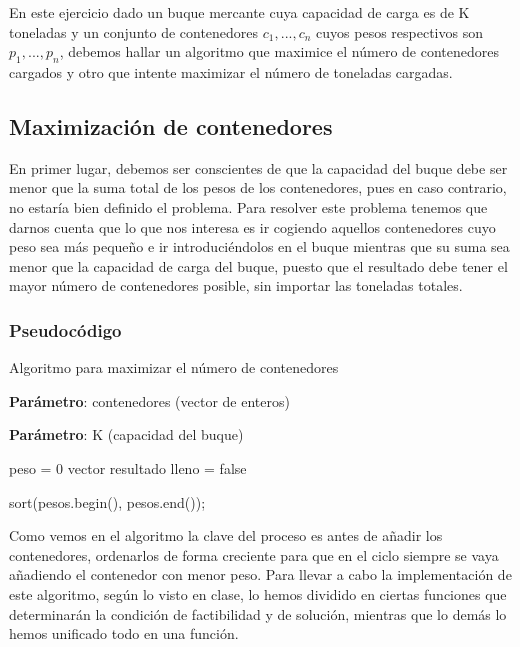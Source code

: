 En este ejercicio dado un buque mercante cuya capacidad de carga es de K toneladas y un conjunto de contenedores $c_1,...,c_n$ cuyos
pesos respectivos son $p_1,...,p_n$, debemos hallar un algoritmo que maximice el número de contenedores cargados y otro que intente 
maximizar el número de toneladas cargadas.

\subsection{Maximización de contenedores}

En primer lugar, debemos ser conscientes de que la capacidad del buque debe ser menor que la suma total de los pesos 
de los contenedores, pues en caso contrario, no estaría bien definido el problema. Para resolver este problema tenemos que darnos cuenta
que lo que nos interesa es ir cogiendo aquellos contenedores cuyo peso sea más pequeño e ir introduciéndolos en el buque mientras que su suma 
sea menor que la capacidad de carga del buque, puesto que el resultado debe tener el mayor número de contenedores posible, sin importar las 
toneladas totales. 

\subsubsection{Pseudocódigo}

\begin{algorithm}[H]
    \caption{Algoritmo para maximizar el número de contenedores}\label{alg:max_containers}
    \begin{minipage}{0.92\textwidth}
    \textbf{Parámetro}: contenedores (vector de enteros)

    \textbf{Parámetro}: K (capacidad del buque)

    \end{minipage}

    peso = 0\;
    vector resultado\;
    lleno = false\;

    sort(pesos.begin(), pesos.end());

     {
    }

    
\end{algorithm}

Como vemos en el algoritmo la clave del proceso es antes de añadir los contenedores, ordenarlos de forma creciente para que 
en el ciclo siempre se vaya añadiendo el contenedor con menor peso. 
Para llevar a cabo la implementación de este algoritmo, según lo visto en clase, lo hemos dividido en ciertas funciones que 
determinarán la condición de factibilidad y de solución, mientras que lo demás lo hemos unificado todo en una función. 

